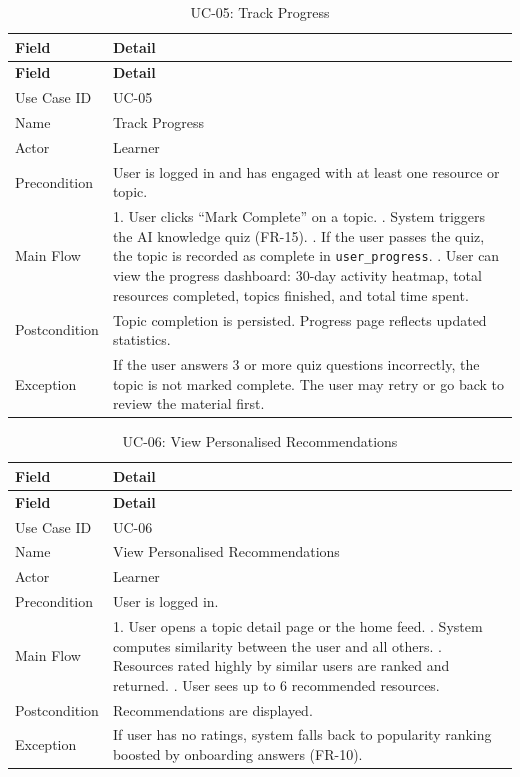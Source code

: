 \documentclass[12pt,a4paper]{report}
\begin{document}
\begin{longtable}{p{} p{}}
\caption{UC-05: Track Progress}\label{tab:uc05}\\
\toprule
\textbf{Field} & \textbf{Detail} \\
\midrule
\endfirsthead
\toprule
\textbf{Field} & \textbf{Detail} \\
\midrule
\endhead
Use Case ID & UC-05 \\
Name & Track Progress \\
Actor & Learner \\
Precondition & User is logged in and has engaged with at least one resource or topic. \\
Main Flow & 1. User clicks ``Mark Complete'' on a topic. \newline 2. System triggers the AI knowledge quiz (FR-15). \newline 3. If the user passes the quiz, the topic is recorded as complete in \texttt{user\_progress}. \newline 4. User can view the progress dashboard: 30-day activity heatmap, total resources completed, topics finished, and total time spent. \\
Postcondition & Topic completion is persisted. Progress page reflects updated statistics. \\
Exception & If the user answers 3 or more quiz questions incorrectly, the topic is not marked complete. The user may retry or go back to review the material first. \\
\bottomrule
\end{longtable}

\begin{longtable}{p{} p{}}
\caption{UC-06: View Personalised Recommendations}\label{tab:uc06}\\
\toprule
\textbf{Field} & \textbf{Detail} \\
\midrule
\endfirsthead
\toprule
\textbf{Field} & \textbf{Detail} \\
\midrule
\endhead
Use Case ID & UC-06 \\
Name & View Personalised Recommendations \\
Actor & Learner \\
Precondition & User is logged in. \\
Main Flow & 1. User opens a topic detail page or the home feed. \newline 2. System computes similarity between the user and all others. \newline 3. Resources rated highly by similar users are ranked and returned. \newline 4. User sees up to 6 recommended resources. \\
Postcondition & Recommendations are displayed. \\
Exception & If user has no ratings, system falls back to popularity ranking boosted by onboarding answers (FR-10). \\
\bottomrule
\end{longtable}
\end{document}
